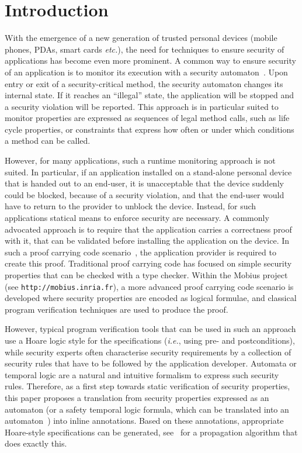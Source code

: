 \section{Introduction}\label{SecIntro}

With the emergence of a new generation of trusted personal devices
(mobile phones, PDAs, smart cards \emph{etc.}), the need for
techniques to ensure security of applications has become even more
prominent. A common way to ensure security of an application is to
monitor its execution with a security automaton~\cite{Schneider99}.
Upon entry or exit of a security-critical method, the security
automaton changes its internal state. If it reaches an ``illegal''
state, the application will be stopped and a security violation will
be reported. This approach is in particular suited to monitor
properties are expressed as sequences of legal method calls, such as
life cycle properties, or constraints that express how often or under
which conditions a method can be called. 

However, for many applications, such a runtime monitoring approach is
not suited. In particular, if an application installed on a
stand-alone personal device that is handed out to an end-user, it is
unacceptable that the device suddenly could be blocked, because of a
security violation, and that the end-user would have to return to the
provider to unblock the device.  Instead, for such applications
statical means to enforce security are necessary. A commonly advocated
approach is to require that the application carries a correctness
proof with it, that can be validated before installing the application
on the device. In such a proof carrying code scenario~\cite{Necula97},
the application provider is required to create this proof. Traditional
proof carrying code has focused on simple security properties that can
be checked with a type checker. Within the
\textsf{Mobius} project (see \texttt{http://mobius.inria.fr}), 
a more advanced proof carrying code scenario is developed where
security properties are encoded as logical formulae, and classical
program verification techniques are used to produce the proof.

However, typical program verification tools that can be used in such
an approach use a Hoare logic style for the specifications
(\emph{i.e.}, using pre- and postconditions), while security experts
often characterise security requirements by a collection of security
rules that have to be followed by the application developer. Automata
or temporal logic are a natural and intuitive formalism to express
such security rules. Therefore, as a first step towards static
verification of security properties, this paper proposes a translation
from security properties expressed as an automaton (or a safety
temporal logic formula, which can be translated into an
automaton~\cite{Wolper01}) into inline annotations. Based on these
annotations, appropriate Hoare-style specifications can be generated,
see~\cite{PavlovaBBHL04} for a propagation algorithm that does exactly
this.

